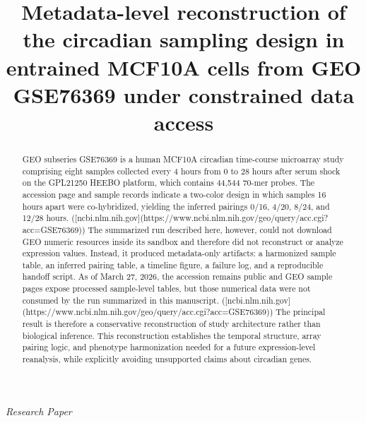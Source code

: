 \documentclass[11pt]{article}
\title{Metadata-level reconstruction of the circadian sampling design in entrained MCF10A cells from GEO GSE76369 under constrained data access}
\author{}
\date{}
\begin{document}
\maketitle

\begin{center}\small\textit{Research Paper}\end{center}

\begin{abstract}

GEO subseries GSE76369 is a human MCF10A circadian time-course microarray study comprising eight samples collected every 4 hours from 0 to 28 hours after serum shock on the GPL21250 HEEBO platform, which contains 44,544 70-mer probes. The accession page and sample records indicate a two-color design in which samples 16 hours apart were co-hybridized, yielding the inferred pairings 0/16, 4/20, 8/24, and 12/28 hours. ([ncbi.nlm.nih.gov](https://www.ncbi.nlm.nih.gov/geo/query/acc.cgi?acc=GSE76369)) The summarized run described here, however, could not download GEO numeric resources inside its sandbox and therefore did not reconstruct or analyze expression values. Instead, it produced metadata-only artifacts: a harmonized sample table, an inferred pairing table, a timeline figure, a failure log, and a reproducible handoff script. As of March 27, 2026, the accession remains public and GEO sample pages expose processed sample-level tables, but those numerical data were not consumed by the run summarized in this manuscript. ([ncbi.nlm.nih.gov](https://www.ncbi.nlm.nih.gov/geo/query/acc.cgi?acc=GSE76369)) The principal result is therefore a conservative reconstruction of study architecture rather than biological inference. This reconstruction establishes the temporal structure, array pairing logic, and phenotype harmonization needed for a future expression-level reanalysis, while explicitly avoiding unsupported claims about circadian genes.

\end{abstract}
\end{document}

